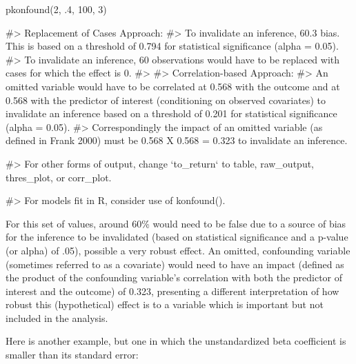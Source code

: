 \begin{Schunk}
\begin{Sinput}
pkonfound(2, .4, 100, 3)
\end{Sinput}
\begin{Soutput}
#> Replacement of Cases Approach:
#> To invalidate an inference, 60.3% of the estimate would have to be due to
bias. This is based on a threshold of 0.794 for statistical significance (alpha
= 0.05).
#> To invalidate an inference, 60 observations would have to be replaced with
cases for which the effect is 0.
#>
#> Correlation-based Approach:
#> An omitted variable would have to be correlated at 0.568 with the outcome
and at 0.568 with the predictor of interest (conditioning on observed
covariates) to invalidate an inference based on a threshold of 0.201 for
statistical significance (alpha = 0.05).
#> Correspondingly the impact of an omitted variable (as defined in Frank 2000)
must be 0.568 X 0.568 = 0.323 to invalidate an inference.
\end{Soutput}
\begin{Soutput}
#> For other forms of output, change `to_return` to table, raw_output, thres_plot, or corr_plot.
\end{Soutput}
\begin{Soutput}
#> For models fit in R, consider use of konfound().
\end{Soutput}
\end{Schunk}

For this set of values, around 60\% would need to be false due to a
source of bias for the inference to be invalidated (based on statistical
significance and a p-value (or alpha) of .05), possible a very robust
effect. An omitted, confounding variable (sometimes referred to as a
covariate) would need to have an impact (defined as the product of the
confounding variable's correlation with both the predictor of interest
and the outcome) of 0.323, presenting a different interpretation of how
robust this (hypothetical) effect is to a variable which is important
but not included in the analysis.

Here is another example, but one in which the unstandardized beta
coefficient is smaller than its standard error:

